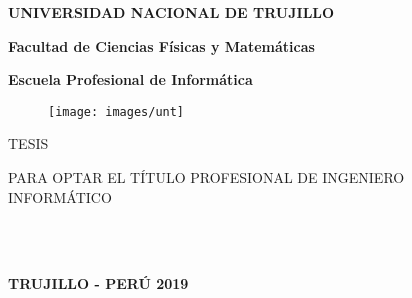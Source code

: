 

\textheight 19cm
\pagestyle{empty}
\begin{center}
 {\bf {\fontsize{14}{16.8}\selectfont UNIVERSIDAD NACIONAL DE TRUJILLO}}     
 
    {\bf{\fontsize{14}{16.8}\selectfont Facultad de Ciencias Físicas y Matemáticas}} 

  {\bf{\fontsize{14}{16.8}\selectfont Escuela Profesional de Informática}}
\end{center}  

\begin{figure}[ht]
\begin{center}
\texttt{[image: images/unt]}
\end{center}
\end{figure}
\vskip 0.5cm

\begin{center}
  {\bf\Large{{\fontsize{17}{20.4}\selectfont{Modelo para la ruterización} }}}     
\end{center}
\vskip 0.5cm

\begin{center}
{\Large{TESIS}}
\end{center}
\begin{center}
{\large{\hspace*{0.4cm} PARA OPTAR EL TÍTULO PROFESIONAL DE INGENIERO  INFORMÁTICO}}
\end{center}

\vskip 0.6cm
\begin{center}
  { \fontsize{14}{16.8}} \\
    { \fontsize{14}{16.8}\selectfont {\hspace{-0.4cm} \authortwo}}\\
    \vskip 0.2cm
    { \fontsize{14}{16.8}}

     
\end{center}   


\vskip 1.1cm
\begin{center}    
{\bf {\fontsize{14}{16.8}\selectfont TRUJILLO - PERÚ
\vskip 0.0cm
\hspace*{-0.2cm} 
2019 }}
\end{center} 
\newpage


